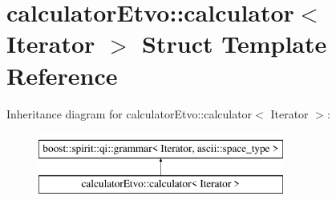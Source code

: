\hypertarget{structcalculator_etvo_1_1calculator}{}\section{calculator\+Etvo\+:\+:calculator$<$ Iterator $>$ Struct Template Reference}
\label{structcalculator_etvo_1_1calculator}
Inheritance diagram for calculator\+Etvo\+:\+:calculator$<$ Iterator $>$\+:\begin{figure}[H]
\begin{center}
\leavevmode
\includegraphics[height=2.000000cm]{structcalculator_etvo_1_1calculator}
\end{center}
\end{figure}
